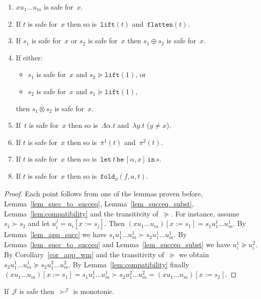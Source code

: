 \documentclass[a4paper,UKenglish,cleveref,autoref,numberwithinsect]{lipics-v2019}
\theoremstyle{definition}
\newcommand{\subst}[2]{#1:=#2}
\newcommand{\abs}[2]{\lambda #1.#2}
\newcommand{\tabs}[2]{\Lambda #1.#2}
\newcommand{\flatten}{\mathtt{flatten}}
\newcommand{\lift}{\mathtt{lift}}
\newcommand{\Termmap}{\mathcal{J}}
\newcommand{\succinterpret}{\succ^{\Termmap}}
\newcommand{\fold}{\mathtt{fold}}
\newcommand{\xlet}[4]{\mathtt{let}_{#1}\,#2\,\mathtt{be}\,[#3]\,\mathtt{in}\,#4}
\begin{document}
\begin{lemma}\label{lem_safe}
  \begin{enumerate}
  \item $x u_1 \ldots u_m$ is safe for~$x$.
  \item If $t$ is safe for~$x$ then so is~$\lift(t)$
    and~$\flatten(t)$.
  \item If $s_1$ is safe for~$x$ or $s_2$ is safe for~$x$ then $s_1
    \oplus s_2$ is safe for~$x$.
  \item If either:
    \begin{itemize}
    \item $s_1$ is safe for~$x$ and $s_2 \succeq \lift(1)$, or
    \item $s_2$ is safe for~$x$ and $s_1 \succeq \lift(1)$,
    \end{itemize}
    then $s_1 \otimes s_2$ is safe for~$x$.
  \item If~$t$ is safe for~$x$ then so is~$\tabs{\alpha}{t}$
    and~$\abs{y}{t}$ ($y \ne x$).
  \item If $t$ is safe for~$x$ then so is~$\pi^1(t)$ and~$\pi^2(t)$.
  \item If $t$ is safe for~$x$ then so is~$\xlet{}{t}{\alpha,x}{s}$.
  \item If $t$ is safe for~$x$ then so is~$\fold_\rho(f,a,t)$.
  \end{enumerate}
\end{lemma}

\begin{proof}
  Each point follows from one of the lemmas proven before,
  Lemma~\ref{lem_succ_to_succeq}, Lemma~\ref{lem_succeq_subst},
  Lemma~\ref{lem:compatibility} and the transitivity of~$\succeq$. For
  instance, assume $s_1 \succ s_2$ and let
  $u_i^j=u_i[\subst{x}{s_j}]$. Then $(x u_1 \ldots
  u_m)[\subst{x}{s_1}] = s_1 u_1^1 \ldots u_m^1$. By
  Lemma~\ref{lem_app_succ} we have $s_1 u_1^1 \ldots u_m^1 \succ s_2
  u_1^1 \ldots u_m^1$. By Lemma~\ref{lem_succ_to_succeq} and
  Lemma~\ref{lem_succeq_subst} we have $u_i^1 \succeq u_i^2$. By
  Corollary~\ref{cor_app_wm} and the transitivity of~$\succeq$ we
  obtain $s_2 u_1^1 \ldots u_m^1 \succeq s_2 u_1^2 \ldots u_m^2$. By
  Lemma~\ref{lem:compatibility} finally $(x u_1 \ldots
  u_m)[\subst{x}{s_1}] = s_1 u_1^1 \ldots u_m^1 \succ s_2 u_1^2 \ldots
  u_m^2 = (x u_1 \ldots u_m)[\subst{x}{s_2}]$.
\end{proof}

\begin{lemma}\label{lem_succinterpret_monotonic}
  If~$\Termmap$ is safe then~$\succinterpret$ is monotonic.
\end{lemma}
\end{document}
